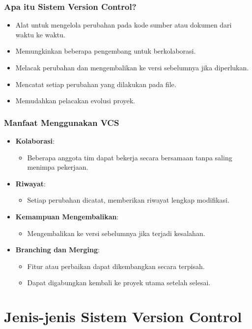\documentclass[aspectratio=169, table]{beamer}
\begin{document}
	
	\begin{frame}[fragile]
		\frametitle{Apa itu Sistem Version Control?}
		\begin{itemize}
			\item Alat untuk mengelola perubahan pada kode sumber atau dokumen dari waktu ke waktu.
			\item Memungkinkan beberapa pengembang untuk berkolaborasi.
			\item Melacak perubahan dan mengembalikan ke versi sebelumnya jika diperlukan.
			\item Mencatat setiap perubahan yang dilakukan pada file.
			\item Memudahkan pelacakan evolusi proyek.
		\end{itemize}
	\end{frame}
	
	\begin{frame}[fragile]
		\frametitle{Manfaat Menggunakan VCS}
		\begin{itemize}
			\item \textbf{Kolaborasi}: 
			\begin{itemize}
				\item Beberapa anggota tim dapat bekerja secara bersamaan tanpa saling menimpa pekerjaan.
			\end{itemize}
			\item \textbf{Riwayat}: 
			\begin{itemize}
				\item Setiap perubahan dicatat, memberikan riwayat lengkap modifikasi.
			\end{itemize}
			\item \textbf{Kemampuan Mengembalikan}: 
			\begin{itemize}
				\item Mengembalikan ke versi sebelumnya jika terjadi kesalahan.
			\end{itemize}
			\item \textbf{Branching dan Merging}: 
			\begin{itemize}
				\item Fitur atau perbaikan dapat dikembangkan secara terpisah.
				\item Dapat digabungkan kembali ke proyek utama setelah selesai.
			\end{itemize}
		\end{itemize}
	\end{frame}
	
	\section{Jenis-jenis Sistem Version Control}
	
\end{document}
